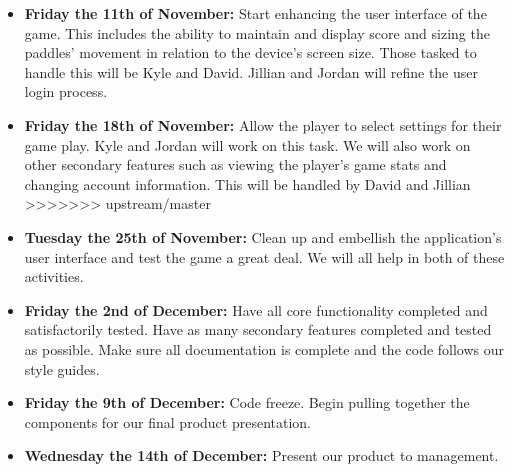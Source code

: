 \documentclass[12pt]{article}
\begin{document}
\begin{itemize}
\item \textbf{Friday the 11th of November:} Start enhancing the user interface of the game.  This includes the ability to maintain and display score and sizing the paddles' movement in relation to the device’s screen size.  Those tasked to handle this will be Kyle and David.  Jillian and Jordan will refine the user login process.

\item \textbf{Friday the 18th of November:} Allow the player to select settings for their game play.  Kyle and Jordan will work on this task. We will also work on other secondary features such as viewing the player’s game stats and changing account information.  This will be handled by David and Jillian
>>>>>>> upstream/master

\item \textbf{Tuesday the 25th of November:} Clean up and embellish the application’s user interface and test the game a great deal.  We will all help in both of these activities. 

\item \textbf{Friday the 2nd of December:} Have all core functionality completed and satisfactorily tested.  Have as many secondary features completed and tested as possible.  Make sure all documentation is complete and the code follows our style guides. 

\item \textbf{Friday the 9th of December:} Code freeze.  Begin pulling together the components for our final product presentation.

\item \textbf{Wednesday the 14th of December:}  Present our product to management.
\end{itemize}



\newpage


\end{document}
